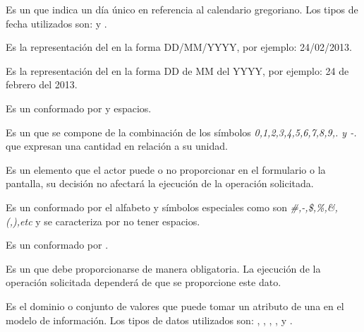 \begin{description}
     Es un  que indica un día único en referencia al calendario gregoriano. Los tipos de fecha utilizados son:  y . %

     Es la representación del   en la forma DD/MM/YYYY, por ejemplo: 24/02/2013.

     Es la representación del   en la forma DD de MM del YYYY, por ejemplo: 24 de febrero del 2013.

     Es un   conformado por  y espacios.
    
     Es un  que se compone de la combinación de los símbolos \textit{0,1,2,3,4,5,6,7,8,9,. y -.}  que expresan una cantidad en relación a su unidad.
    
     Es un elemento que el actor puede o no proporcionar en el formulario o la pantalla, su decisión no afectará la ejecución de la operación solicitada.

     Es un   conformado por el alfabeto y símbolos especiales como son \textit{\#,-,\$,\%,\&,(,),etc} y se caracteriza por no tener espacios.

     Es un   conformado por .

     Es un  que debe proporcionarse de manera obligatoria. La ejecución de la operación solicitada dependerá de que se proporcione este dato.
    

     Es el dominio o conjunto de valores que puede tomar un atributo de una  en el modelo de información. Los tipos de datos utilizados son: , , , ,  y .

\end{description}


